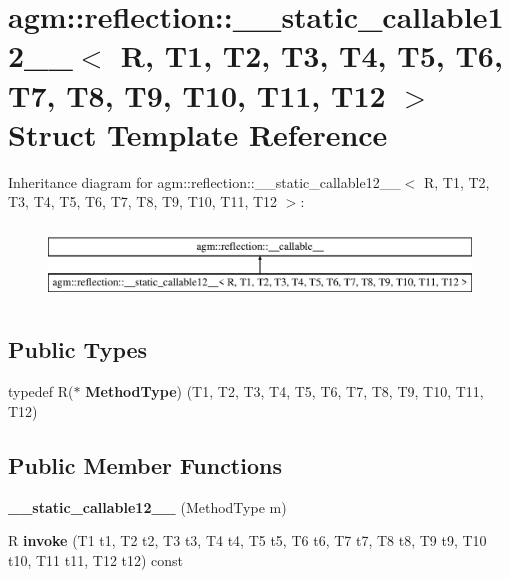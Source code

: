 \hypertarget{structagm_1_1reflection_1_1____static__callable12____}{}\section{agm\+:\+:reflection\+:\+:\+\_\+\+\_\+static\+\_\+callable12\+\_\+\+\_\+$<$ R, T1, T2, T3, T4, T5, T6, T7, T8, T9, T10, T11, T12 $>$ Struct Template Reference}
\label{structagm_1_1reflection_1_1____static__callable12____}
Inheritance diagram for agm\+:\+:reflection\+:\+:\+\_\+\+\_\+static\+\_\+callable12\+\_\+\+\_\+$<$ R, T1, T2, T3, T4, T5, T6, T7, T8, T9, T10, T11, T12 $>$\+:\begin{figure}[H]
\begin{center}
\leavevmode
\includegraphics[height=2.000000cm]{structagm_1_1reflection_1_1____static__callable12____}
\end{center}
\end{figure}
\subsection*{Public Types}
\begin{DoxyCompactItemize}
\item 
typedef R($\ast$ {\bfseries Method\+Type}) (T1, T2, T3, T4, T5, T6, T7, T8, T9, T10, T11, T12)\hypertarget{structagm_1_1reflection_1_1____static__callable12_____a8c8025a4dedfd21ebb185bbfe0ccb97a}{}\label{structagm_1_1reflection_1_1____static__callable12_____a8c8025a4dedfd21ebb185bbfe0ccb97a}

\end{DoxyCompactItemize}
\subsection*{Public Member Functions}
\begin{DoxyCompactItemize}
\item 
{\bfseries \+\_\+\+\_\+static\+\_\+callable12\+\_\+\+\_\+} (Method\+Type m)\hypertarget{structagm_1_1reflection_1_1____static__callable12_____aa342fc1e3c1c877c84fdf34a54eac937}{}\label{structagm_1_1reflection_1_1____static__callable12_____aa342fc1e3c1c877c84fdf34a54eac937}

\item 
R {\bfseries invoke} (T1 t1, T2 t2, T3 t3, T4 t4, T5 t5, T6 t6, T7 t7, T8 t8, T9 t9, T10 t10, T11 t11, T12 t12) const \hypertarget{structagm_1_1reflection_1_1____static__callable12_____a57a05a262ebffc6302c67c07fc29168f}{}\label{structagm_1_1reflection_1_1____static__callable12_____a57a05a262ebffc6302c67c07fc29168f}

\end{DoxyCompactItemize}

